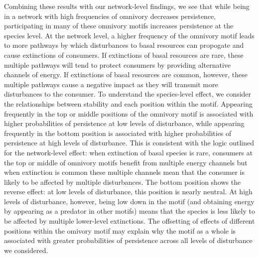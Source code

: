 \documentclass[12pt]{article}
\begin{document}
\begin{spacing}{2.0}
Combining these results with our network-level findings, we see that while being in a network with high frequencies of omnivory decreases persistence, participating in many of these omnivory motifs increases persistence at the species level.
At the network level, a higher frequency of the omnivory motif leads to more pathways by which disturbances to basal resources can propogate and cause extinctions of consumers.
If extinctions of basal resources are rare, these multiple pathways will tend to protect consumers by providing alternative channels of energy.
If extinctions of basal resources are common, however, these multiple pathways cause a negative impact as they will transmit more disturbances to the consumer.
To understand the species-level effect, we consider the relationships between stability and each position within the motif.
Appearing frequently in the top or middle positions of the omnivory motif is associated with higher probabilities of persistence at low levels of disturbance, while appearing frequently in the bottom position is associated with higher probabilities of persistence at high levels of disturbance.
This is consistent with the logic outlined for the network-level effect: when extinction of basal species is rare, consumers at the top or middle of omnivory motifs benefit from multiple energy channels but when extinction is common these multiple channels mean that the consumer is likely to be affected by multiple disturbances.
The bottom position shows the reverse effect: at low levels of disturbance, this position is nearly neutral. 
At high levels of disturbance, however, being low down in the motif (and obtaining energy by appearing as a predator in other motifs) means that the species is less likely to be affected by multiple lower-level extinctions.
The offsetting of effects of different positions within the omivory motif may explain why the motif as a whole is associated with greater probabilities of persistence across all levels of disturbance we considered.



\end{spacing}
\end{document}
